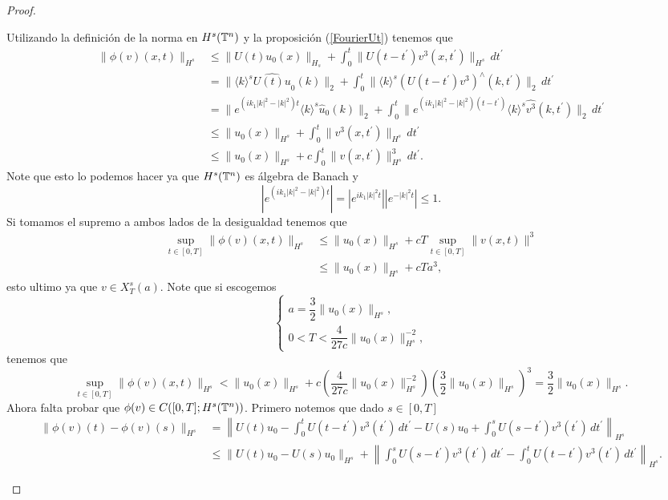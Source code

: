 \begin{proof}
\begin{itemize}
       Utilizando la definición de la norma en $H^s(\mathbb{T}^n)$ y la proposición (\ref{FourierUt}) tenemos que
       \begin{align*}
           \|\phi(v)(x,t)\|_{H^s}&\leq\|U(t)u_0(x)\|_{H_s}+\int_0^t\|U(t-t^\prime)v^3(x,t^\prime)\|_{H^s}\,dt^\prime\\
           &=\|\langle k\rangle^s\widehat{U(t)u}_0(k)\|_2+\int_0^t\|\langle k\rangle^s(U(t-t^\prime)v^3)^\wedge(k,t^\prime)\|_2\,dt^\prime\\
           &=\|e^{(ik_1|k|^2-|k|^2)t}\langle k\rangle^s\widehat{u}_0(k)\|_2+\int_0^t\|e^{(ik_1|k|^2-|k|^2)(t-t^\prime)}\langle k\rangle^s\widehat{v^3}(k,t^\prime)\|_2\,dt^\prime\\
           &\leq\|u_0(x)\|_{H^s}+\int_0^t\|v^3(x,t^\prime)\|_{H^s}\,dt^\prime\\
           &\leq\|u_0(x)\|_{H^s}+c\int_0^t\|v(x,t^\prime)\|^3_{H^s}\,dt^\prime.
       \end{align*}
       Note que esto lo podemos hacer ya que $H^s(\mathbb{T}^n)$ es álgebra de Banach y 
       $$\left|e^{(ik_1|k|^2-|k|^2)t}\right|=\left|e^{ik_1|k|^2t}\right|\left|e^{-|k|^2t}\right|\leq 1.$$
       Si tomamos el supremo a ambos lados de la desigualdad tenemos que
       \begin{align*}
           \sup_{t\in[0,T]}\|\phi(v)(x,t)\|_{H^s}&\leq\|u_0(x)\|_{H^s}+cT\sup_{t\in[0,T]}\|v(x,t)\|^3\\
           &\leq\|u_0(x)\|_{H^s}+cTa^3,
       \end{align*}
       esto ultimo ya que $v\in X_T^s(a).$ Note que si escogemos
       $$\begin{cases}
           a=\dfrac{3}{2}\|u_0(x)\|_{H^s},\\
           0<T<\dfrac{4}{27c}\|u_0(x)\|^{-2}_{H^s},
       \end{cases}$$
       tenemos que
       $$\sup_{t\in[0,T]}\|\phi(v)(x,t)\|_{H^s}<\|u_0(x)\|_{H^s}+c\left(\dfrac{4}{27c}\|u_0(x)\|^{-2}_{H^s}\right)\left(\dfrac{3}{2}\|u_0(x)\|_{H^s}\right)^3 =\dfrac{3}{2}\|u_0(x)\|_{H^s}.$$
       Ahora falta probar que $\phi(v)\in C([0,T];H^s(\mathbb{T}^n))$. Primero notemos que dado $s\in[0,T]$
       \begin{align*}
           \|\phi(v)(t)-\phi(v)(s)\|_{H^s}&=\left\|U(t)u_0-\int_0^tU(t-t^\prime)v^3(t^\prime)\,dt^\prime-U(s)u_0+\int_0^sU(s-t^\prime)v^3(t^\prime)\,dt^\prime\right\|_{H^s}\\
           &\leq\|U(t)u_0-U(s)u_0\|_{H^s}+\left\|\int_0^sU(s-t^\prime)v^3(t^\prime)\,dt^\prime-\int_0^tU(t-t^\prime)v^3(t^\prime)\,dt^\prime\right\|_{H^s}.

\end{align*}
\end{itemize}
\end{proof}
